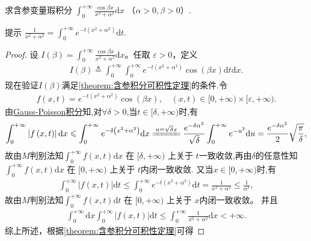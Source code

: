 \documentclass[../../main.tex]{subfiles}%
\begin{document}
\begin{example}
求含参变量瑕积分 \(\int_0^{+\infty} \frac{\cos \beta x}{x^2 + \alpha^2} \mathrm{d}x\) （\(\alpha > 0, \beta > 0\)）.
\end{example}
\begin{note}
提示 \(\frac{1}{x^2 + \alpha^2} = \int_{0}^{+\infty} e^{-t(x^2+\alpha^2)} \mathrm{d}t\).
\end{note}
\begin{proof}
设 \(I(\beta) = \int_0^{+\infty} \frac{\cos \beta x}{x^2 + \alpha^2} \mathrm{d}x\)。任取 \(\varepsilon > 0\)，定义
\begin{align*}
I(\beta )\triangleq \int_0^{+\infty}{\int_0^{+\infty}{e^{-t\left( x^2+\alpha ^2 \right)}\cos \left( \beta x \right) \mathrm{d}t\mathrm{d}x}}.
\end{align*}
现在验证$I(\beta)$满足\cref{theorem:含参积分可积性定理}的条件.令 
\begin{align*}
f(x, t) = e^{-t(x^2+\alpha^2)} \cos(\beta x),\quad (x,t)\in [0, +\infty) \times [\varepsilon, +\infty).
\end{align*}
由\hyperref[proposition:重要定积分结论-1]{Gauss-Poisson积分}知,对$\forall \delta>0$,当$t\in[\delta,+\infty)$时,有
\begin{align*}
\int_0^{+\infty}{\left| f\left( x,t \right) \right|\mathrm{d}x}\leqslant \int_0^{+\infty}{e^{-\delta \left( x^2+\alpha ^2 \right)}\mathrm{d}x}\xlongequal{u=\sqrt{\delta}x}\frac{e^{-\delta \alpha ^2}}{\sqrt{\delta}}\int_0^{+\infty}{e^{-u^2}\mathrm{d}u}=\frac{e^{-\delta \alpha ^2}}{2}\sqrt{\frac{\pi}{\delta}},
\end{align*}
故由$M$判别法知\(\int_0^{+\infty} f(x,t) \mathrm{d}x\) 在 \([\delta, +\infty)\) 上关于 \(t\)一致收敛,再由$\delta$的任意性知\(\int_0^{+\infty} f(x,t) \mathrm{d}x\) 在 \([0, +\infty)\) 上关于 \(t\)内闭一致收敛.
又当$x\in[0,+\infty)$时,有
\begin{align*}
\int_0^{+\infty}{\left| f\left( x,t \right) \right|\mathrm{d}t}\leqslant \int_0^{+\infty}{e^{-t\left( x^2+\alpha ^2 \right)}\mathrm{d}t}=\frac{1}{x^2+\alpha ^2}\leqslant \frac{1}{\alpha ^2},
\end{align*}
故由$M$判别法知\(\int_0^{+\infty}{f\left( x,t \right) \mathrm{d}t}\) 在 \([0, +\infty)\) 上关于 \(x\)内闭一致收敛。
并且
\begin{align*}
\int_0^{+\infty}{\mathrm{d}x\int_0^{+\infty}{|f(x,t)|\mathrm{d}t}}\leqslant \int_0^{+\infty}{\frac{1}{x^2+\alpha ^2}\mathrm{d}x}<+\infty .
\end{align*}
综上所述，根据\cref{theorem:含参积分可积性定理}可得

\end{proof}
\end{document}
